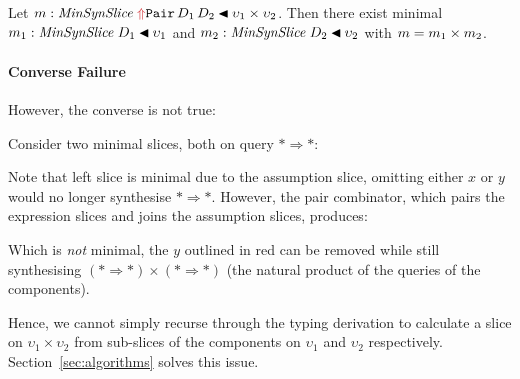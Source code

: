 \begin{thmcase}\label{thm:min-prod-decomp}
Let $m : \minsynslice{\synr{Pair}\,D_1\,D_2}{\upsilon_1 \times \upsilon_2}$. Then there exist minimal $m_1 : \mathit{MinSynSlice}\;D_1 \mathbin{\blacktriangleleft} \upsilon_1$ and $m_2 : \mathit{MinSynSlice}\;D_2 \mathbin{\blacktriangleleft} \upsilon_2$ with $m = m_1 \times m_2$.
\end{thmcase}

\paragraph{\yo Converse Failure}
\label{sec:ce-prod-not-closed-min}

However, the converse is not true:

\begin{counterexamplebox}
%
\begin{counterexample}\label{lem:prod-not-minimal}

Consider two minimal slices, both on query $* \Rightarrow *$:
\begin{center}
\quad {}\quad
{}
\end{center}
Note that left slice is minimal due to the assumption slice, omitting either $x$ or $y$ would no longer synthesise $* \Rightarrow *$. However, the pair combinator, which pairs the expression slices and joins the assumption slices, produces:
\begin{center}
\end{center}
Which is \textit{not} minimal, the $y$ outlined in red can be removed while still synthesising $(* \Rightarrow *) \times (* \Rightarrow *)$ (the natural product of the queries of the components).
\end{counterexample}
\end{counterexamplebox}

Hence, we cannot simply recurse through the typing derivation to calculate a slice on $\upsilon_1 \times \upsilon_2$ from sub-slices of the components on $\upsilon_1$ and $\upsilon_2$ respectively. Section~\ref{sec:algorithms} solves this issue.

